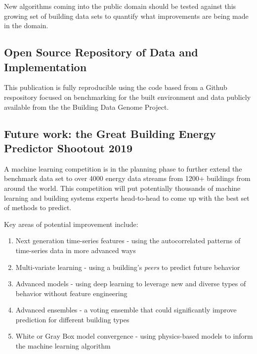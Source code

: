 \documentclass[preprint,12pt]{elsarticle}
\begin{document}
New algorithms coming into the public domain should be tested against this growing set of building data sets to quantify what improvements are being made in the domain.

\subsection{Open Source Repository of Data and Implementation}
\label{sec:opensourcerepository}
This publication is fully reproducible using the code based from a Github respository focused on benchmarking for the built environment and data publicly available from the the Building Data Genome Project.

\subsection{Future work: the Great Building Energy Predictor Shootout 2019}
\label{sec:predictorshootout}
A machine learning competition is in the planning phase to further extend the benchmark data set to over 4000 energy data streams from 1200+ buildings from around the world. This competition will put potentially thousands of machine learning and building systems experts head-to-head to come up with the best set of methods to predict. 

Key areas of potential improvement include:
\begin{enumerate}
  \item Next generation time-series features - using the autocorrelated patterns of time-series data in more advanced ways
  \item Multi-variate learning - using a building's \emph{peers} to predict future behavior
  \item Advanced models - using deep learning to leverage new and diverse types of behavior without feature engineering
  \item Advanced ensembles - a voting ensemble that could significantly improve prediction for different building types
  \item White or Gray Box model convergence - using physics-based models to inform the machine learning algorithm
\end{enumerate}

\end{document}
